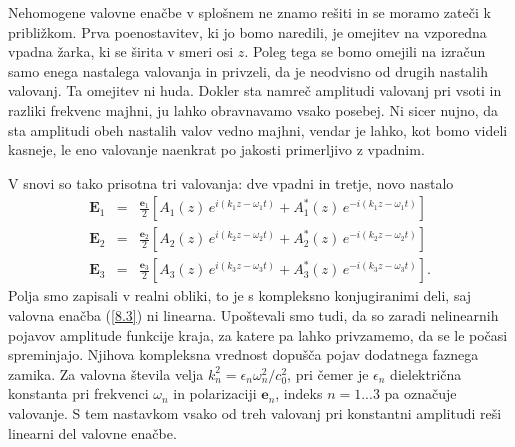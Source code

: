 Nehomogene valovne enačbe v splošnem ne znamo rešiti in se moramo zateči k približkom.
Prva poenostavitev, ki jo bomo naredili, je omejitev na vzporedna vpadna žarka,
ki se širita v smeri osi $z$. Poleg tega se bomo omejili na izračun samo enega
nastalega valovanja in privzeli, da je neodvisno od drugih nastalih valovanj.
Ta omejitev ni huda. Dokler sta namreč amplitudi valovanj pri vsoti in razliki
frekvenc majhni, ju lahko obravnavamo vsako posebej. Ni sicer nujno,
da sta amplitudi obeh nastalih valov vedno majhni, vendar je lahko, kot bomo videli kasneje, 
le eno valovanje naenkrat po jakosti primerljivo z vpadnim. 

V snovi so tako prisotna tri valovanja:
dve vpadni in tretje, novo nastalo
\begin{eqnarray}
\mathbf{E}_{1} & = & \frac{\mathbf{e}_{1}}{2}\left[A_{1}(z)\, 
e^{i(k_{1}z-\omega_{1}t)}+A_{1}^{*}(z)\, e^{-i(k_{1}z-\omega_{1}t)}\right]\nonumber \\
\mathbf{E}_{2} & = & \frac{\mathbf{e}_{2}}{2}\left[A_{2}(z)\, 
e^{i(k_{2}z-\omega_{2}t)}+A_{2}^{*}(z)\, e^{-i(k_{2}z-\omega_{2}t)}\right]\nonumber \\
\mathbf{E}_{3} & = & \frac{\mathbf{e}_{3}}{2}\left[A_{3}(z)\, 
e^{i(k_{3}z-\omega_{3}t)}+A_{3}^{*}(z)\, e^{-i(k_{3}z-\omega_{3}t)}\right].
\end{eqnarray}
Polja smo zapisali v realni obliki, to je s kompleksno konjugiranimi
deli, saj valovna enačba (\ref{8.3}) ni linearna. Upoštevali smo tudi,
da so zaradi nelinearnih pojavov amplitude funkcije kraja, za
katere pa lahko privzamemo, da se le počasi spreminjajo. Njihova kompleksna vrednost
dopušča pojav dodatnega faznega zamika. Za valovna
števila velja $k_{n}^{2}=\epsilon_{n}\omega_n^{2}/c_0^{2}$,
pri čemer je $\epsilon_{n}$ dielektrična konstanta pri frekvenci
$\omega_{n}$ in polarizaciji $\mathbf{e}_{n}$, indeks $n = 1...3$ pa označuje
valovanje. S tem nastavkom vsako od treh valovanj
pri konstantni amplitudi reši linearni del valovne enačbe. 

